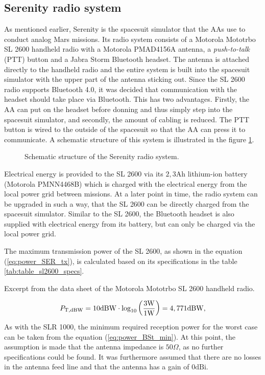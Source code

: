 \subsection{Serenity radio system}
As mentioned earlier, Serenity is the spacesuit simulator that the AAs use to conduct analog Mars missions. Its radio system consists of a Motorola Mototrbo SL 2600 handheld radio with a Motorola PMAD4156A antenna, a \emph{push-to-talk} (PTT) button and a Jabra Storm Bluetooth headset. The antenna is attached directly to the handheld radio and the entire system is built into the spacesuit simulator with the upper part of the antenna sticking out. Since the SL 2600 radio supports Bluetooth 4.0, it was decided that communication with the headset should take place via Bluetooth. This has two advantages. Firstly, the AA can put on the headset before donning and thus simply step into the spacesuit simulator, and secondly, the amount of cabling is reduced. The PTT button is wired to the outside of the spacesuit so that the AA can press it to communicate. A schematic structure of this system is illustrated in the figure \ref{fig:tikz_serenity_radio_system}.
\begin{figure}[h!]
	\centering
	
	\caption{Schematic structure of the Serenity radio system.}
	\label{fig:tikz_serenity_radio_system}
\end{figure}

Electrical energy is provided to the SL 2600 via its $2,3\mathrm{Ah}$ lithium-ion battery (Motorola PMNN4468B) which is charged with the electrical energy from the local power grid between missions. At a later point in time, the radio system can be upgraded in such a way, that the SL 2600 can be directly charged from the spacesuit simulator. Similar to the SL 2600, the Bluetooth headset is also supplied with electrical energy from its battery, but can only be charged via the local power grid. 

The maximum transmission power of the SL 2600, as shown in the equation (\ref{eq:power_SER_tx}), is calculated based on its specifications in the table \ref{tab:table_sl2600_specs}.
\begin{table}[h!] %
	\centering
	
	\caption{Excerpt from the data sheet of the Motorola Mototrbo SL 2600 handheld radio. \cite{SL2600:2017}}
	\label{tab:table_sl2600_specs}
\end{table}
\begin{equation} \label{eq:power_SER_tx}
	\centering
	P_\mathrm{T,dBW} =  10\mathrm{dBW} \cdot \log_{10} \left( \dfrac{3\mathrm{W}}{1\mathrm{W}} \right) = 4,771\mathrm{dBW}\text{,}
\end{equation}
As with the SLR 1000, the minimum required reception power for the worst case can be taken from the equation (\ref{eq:power_BSt_min}). At this point, the assumption is made that the antenna impedance is $50\Omega$, as no further specifications could be found. It was furthermore assumed that there are no losses in the antenna feed line and that the antenna has a gain of $0\mathrm{dBi}$. 


